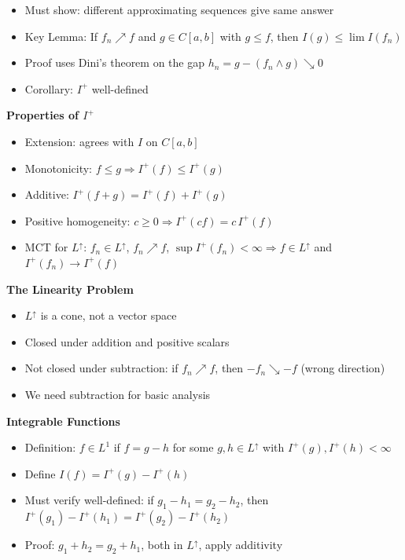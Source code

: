 \documentclass[
  10pt,
  letterpaper,
]{scrbook}
\providecommand{\tightlist}{%
  \setlength{\itemsep}{0pt}\setlength{\parskip}{0pt}}
\begin{document}
\begin{itemize}
\tightlist
\item
  Must show: different approximating sequences give same answer
\item
  Key Lemma: If \(f_n \nearrow f\) and \(g \in C[a,b]\) with
  \(g \leq f\), then \(I(g) \leq \lim I(f_n)\)
\item
  Proof uses Dini's theorem on the gap
  \(h_n = g - (f_n \wedge g) \searrow 0\)
\item
  Corollary: \(I^+\) well-defined
\end{itemize}

\textbf{Properties of \(I^+\)}

\begin{itemize}
\tightlist
\item
  Extension: agrees with \(I\) on \(C[a,b]\)
\item
  Monotonicity: \(f \leq g \Rightarrow I^+(f) \leq I^+(g)\)
\item
  Additive: \(I^+(f + g) = I^+(f) + I^+(g)\)
\item
  Positive homogeneity: \(c \geq 0 \Rightarrow I^+(cf) = c \, I^+(f)\)
\item
  MCT for \(L^\uparrow\): \(f_n \in L^\uparrow\), \(f_n \nearrow f\),
  \(\sup I^+(f_n) < \infty \Rightarrow f \in L^\uparrow\) and
  \(I^+(f_n) \to I^+(f)\)
\end{itemize}

\textbf{The Linearity Problem}

\begin{itemize}
\tightlist
\item
  \(L^\uparrow\) is a cone, not a vector space
\item
  Closed under addition and positive scalars
\item
  Not closed under subtraction: if \(f_n \nearrow f\), then
  \(-f_n \searrow -f\) (wrong direction)
\item
  We need subtraction for basic analysis
\end{itemize}

\textbf{Integrable Functions}

\begin{itemize}
\tightlist
\item
  Definition: \(f \in L^1\) if \(f = g - h\) for some
  \(g, h \in L^\uparrow\) with \(I^+(g), I^+(h) < \infty\)
\item
  Define \(I(f) = I^+(g) - I^+(h)\)
\item
  Must verify well-defined: if \(g_1 - h_1 = g_2 - h_2\), then
  \(I^+(g_1) - I^+(h_1) = I^+(g_2) - I^+(h_2)\)
\item
  Proof: \(g_1 + h_2 = g_2 + h_1\), both in \(L^\uparrow\), apply
  additivity
\end{itemize}
\end{document}
